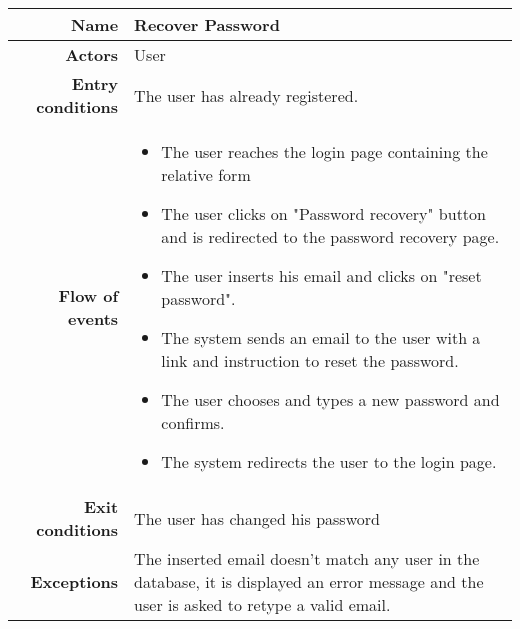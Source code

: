 \begin{center}
\begin{tabular}{r|p{7cm}}
\bf\large Name&\bf\large Recover Password \\
\hline
\hline
\bf Actors&User\\
\hline
\bf Entry conditions&The user has already registered.\\
\hline
\bf Flow of events&
\begin{itemize}
\item The user reaches the login page containing the relative form
\item The user clicks on "Password recovery" button and is redirected to the password recovery page.
\item The user inserts his email and clicks on "reset password".
\item The system sends an email to the user with a link and instruction to reset the password.
\item The user chooses and types a new password and confirms.
\item The system redirects the user to the login page.
\end{itemize}
\\
\hline
\bf Exit conditions&The user has changed his password \\
\hline
\bf Exceptions&The inserted email doesn't match any user in the database, it is displayed an error message and the user is asked to retype a valid email.\\
\hline

\end{tabular}
\end{center}